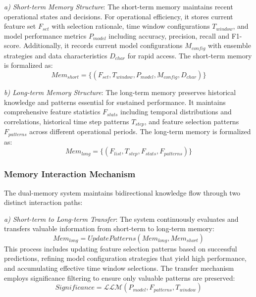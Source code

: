\documentclass[conference]{IEEEtran}
\begin{document}
\textit{a) Short-term Memory Structure}: The short-term memory maintains recent operational states and decisions. For operational efficiency, it stores current feature set $F_{set}$ with selection rationale, time window configurations $T_{window}$, and model performance metrics $P_{model}$ including accuracy, precision, recall and F1-score. Additionally, it records current model configurations $M_{config}$ with ensemble strategies and data characteristics $D_{char}$ for rapid access. The short-term memory is formalized as:
\begin{equation}
    Mem_{short} = \{(F_{set}, T_{window}, P_{model}, M_{config}, D_{char})\}
\end{equation}

\textit{b) Long-term Memory Structure}: The long-term memory preserves historical knowledge and patterns essential for sustained performance. It maintains comprehensive feature statistics $F_{stats}$ including temporal distributions and correlations, historical time step patterns $T_{step}$, and feature selection patterns $F_{patterns}$ across different operational periods. The long-term memory is formalized as:
\begin{equation}
    Mem_{long} = \{(F_{list}, T_{step}, F_{stats}, F_{patterns})\}
\end{equation}

\subsubsection{Memory Interaction Mechanism}
The dual-memory system maintains bidirectional knowledge flow through two distinct interaction paths:

\textit{a) Short-term to Long-term Transfer}: The system continuously evaluates and transfers valuable information from short-term to long-term memory:
\begin{equation}
    Mem_{long} = UpdatePatterns(Mem_{long}, Mem_{short})
\end{equation}
This process includes updating feature selection patterns based on successful predictions, refining model configuration strategies that yield high performance, and accumulating effective time window selections. The transfer mechanism employs significance filtering to ensure only valuable patterns are preserved:
\begin{equation}
    Significance = \mathcal{LLM}(P_{model}, F_{patterns}, T_{window})
\end{equation}
\end{document}
